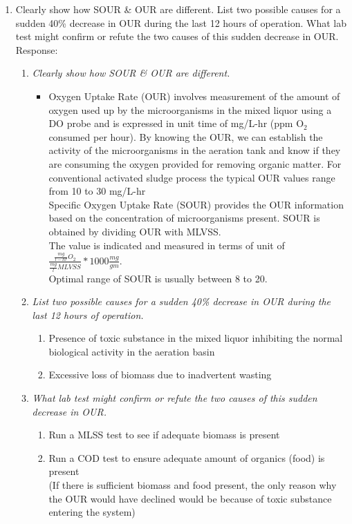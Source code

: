 \begin{enumerate}
\pagebreak
\item Clearly show how SOUR \& OUR are different.  List two possible causes for a sudden 40\% decrease in OUR during the last 12 hours of operation.  What lab test might confirm or refute the two causes of this sudden decrease in OUR.
Response:\\
\begin{enumerate}[label=\alph*]
\item \textit{Clearly show how SOUR \& OUR are different.}
\begin{itemize}
\item Oxygen Uptake Rate (OUR) involves measurement of the amount of oxygen used up by the microorganisms in the mixed liquor using a DO probe and is expressed in unit time of mg/L-hr (ppm O$_2$ consumed per hour). By knowing the OUR, we can establish the activity of the microorganisms in the aeration tank and know if they are consuming the oxygen provided for removing organic matter.  For conventional activated sludge process the typical OUR values range from 10 to 30 mg/L-hr\\
\vspace{0.2cm}
Specific Oxygen Uptake Rate (SOUR) provides the OUR information based on the concentration of microorganisms present. SOUR is obtained by dividing OUR with MLVSS.\\
\vspace{0.2cm}
The value is indicated and measured in terms of unit of $\frac{\frac{mg}{l-hr}O_2}{\frac{mg}{l}MLVSS}*1000\frac{mg}{gm}$. \\
\vspace{0.2cm}
Optimal range of SOUR is usually between 8 to 20.\\
\end{itemize}
\item \textit{List two possible causes for a sudden 40\% decrease in OUR during the last 12 hours of operation.}
\begin{enumerate}
\item Presence of toxic substance in the mixed liquor inhibiting the normal biological activity in the aeration basin
\item Excessive loss of biomass due to  inadvertent wasting 

\end{enumerate}
\item \textit{What lab test might confirm or refute the two causes of this sudden decrease in OUR.}
\begin{enumerate}
\item Run a MLSS test to see if adequate biomass is present
\item Run a COD test to ensure adequate amount of organics (food) is present\\
(If there is sufficient biomass and food present, the only reason why the OUR would have declined would be because of toxic substance entering the system)
 

\end{enumerate}
\end{enumerate}
\end{enumerate}
